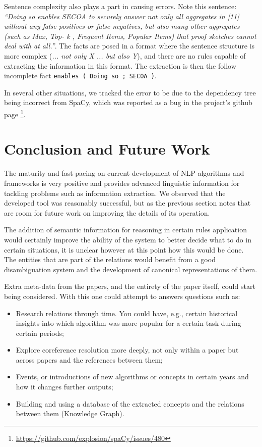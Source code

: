 \documentclass[11pt,a4paper,openright]{memoir}
\begin{document}
Sentence complexity also plays a part in causing errors. Note this sentence: \emph{\enquote{Doing so enables SECOA to securely answer not only all aggregates in [11] without any false positives or false negatives, but also many other aggregates (such as Max, Top- k , Frequent Items, Popular Items) that proof sketches cannot deal with at all.}}. The facts are posed in a format where the sentence structure is more complex (\emph{... not only X ... but also Y}), and there are no rules capable of extracting the information in this format. The extraction is then the follow incomplete fact \texttt{enables	( Doing so ; SECOA )}.

In several other situations, we tracked the error to be due to the dependency tree being incorrect from SpaCy, which was reported as a bug in the project's github page \footnote{\url{https://github.com/explosion/spaCy/issues/480}}.


%
%
%
%


\chapter{Conclusion and Future Work}
\label{chapter:conclusion}

The maturity and fast-pacing on current development of NLP algorithms and frameworks is very positive and provides advanced linguistic information for tackling problems such as information extraction. We observed that the developed tool was reasonably successful, but as the previous section notes that are room for future work on improving the details of its operation.

The addition of semantic information for reasoning in certain rules application would certainly improve the ability of the system to better decide what to do in certain situations, it is unclear however at this point how this would be done. The entities that are part of the relations would benefit from a good disambiguation system and the development of canonical representations of them.

Extra meta-data from the papers, and the entirety of the paper itself, could start being considered. With this one could attempt to answers questions such as:
	\begin{itemize}
	  \item Research relations through time. You could have, e.g., certain historical insights into which algorithm was more popular for a certain task during certain periods;
	  \item Explore coreference resolution more deeply, not only within a paper but across papers and the references between them;
	  \item Events, or introductions of new algorithms or concepts in certain years and how it changes further outputs;
	  \item Building and using a database of the extracted concepts and the relations between them (Knowledge Graph).
	\end{itemize}
\end{document}
